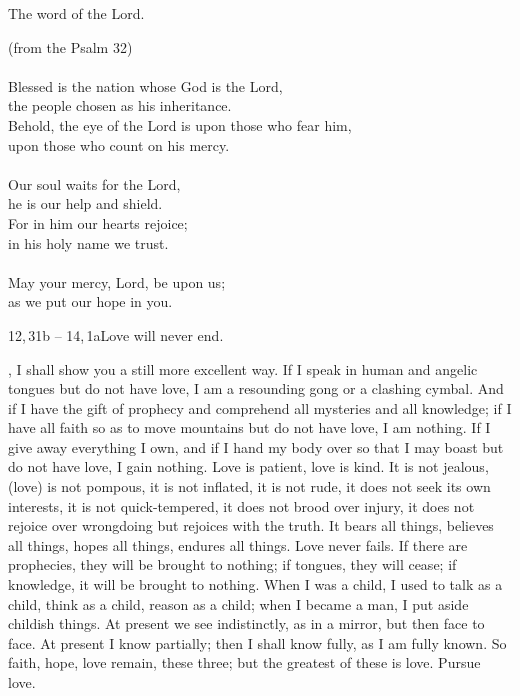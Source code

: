 The word of the Lord.\\


\vspace{10mm}

 {\small(from the Psalm 32)}\\

\\

Blessed is the nation whose God is the Lord,\\
the people chosen as his inheritance.\\
Behold, the eye of the Lord is upon those who fear him,\\
upon those who count on his mercy.\\

\\

Our soul waits for the Lord,\\
he is our help and shield.\\
For in him our hearts rejoice;\\
in his holy name we trust.\\

\\

May your mercy, Lord, be upon us;\\
as we put our hope in you.\\


\newpage

{12,\,31b -- 14,\,1a}{Love will never end.}

, I shall show you a still more excellent way.
If I speak in human and angelic tongues but do not have love,
I am a resounding gong or a clashing cymbal.
And if I have the gift of prophecy and comprehend all
mysteries and all knowledge; if I have all faith so
as to move mountains but do not have love, I am nothing.
If I give away everything I own, and if I hand
my body over so that I may boast but do not have love, I gain nothing.
 Love is patient, love is kind. It is not jealous,
 (love) is not pompous, it is not inflated,
 it is not rude, it does not seek its own interests,
 it is not quick-tempered, it does not brood over injury,
 it does not rejoice over wrongdoing but rejoices with the truth.
It bears all things, believes all things, hopes all things, endures all things.
Love never fails. If there are prophecies,
they will be brought to nothing; if tongues, they will cease;
if knowledge, it will be brought to nothing.
When I was a child, I used to talk as a child, think
as a child, reason as a child; when I became a man, I put aside childish things.
At present we see indistinctly, as in a mirror, but
then face to face. At present I know partially;
then I shall know fully, as I am fully known.
So faith, hope, love remain, these three;
but the greatest of these is love. Pursue love.\\

